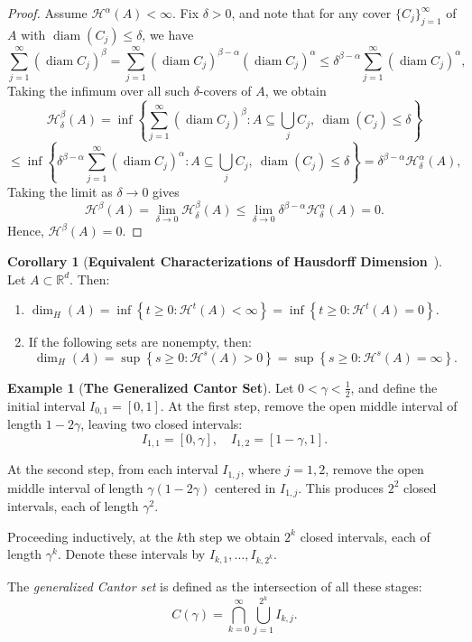 \documentclass[12pt,a4paper]{report}
\theoremstyle{definition}
\newtheorem{example}{Example}
\newtheorem{corollary}{Corollary}
\begin{document}
\begin{proof}
Assume $\mathcal{H}^\alpha(A) < \infty.$ Fix \( \delta > 0 \), and note that for any cover \( \{C_j\}_{j=1}^{\infty} \) of \( A \) with \( \operatorname{diam}(C_j) \leq \delta \), we have
\[
\sum_{j=1}^\infty (\operatorname{diam} C_j)^\beta
= \sum_{j=1}^\infty (\operatorname{diam} C_j)^{\beta - \alpha} (\operatorname{diam} C_j)^\alpha
\leq \delta^{\beta - \alpha} \sum_{j=1}^\infty (\operatorname{diam} C_j)^\alpha,
\]
Taking the infimum over all such \( \delta \)-covers of \( A \), we obtain
\[
\mathcal{H}^\beta_\delta(A)
= \inf \left\{ \sum_{j=1}^\infty (\operatorname{diam} C_j)^\beta : A \subseteq \bigcup_j C_j,\ \operatorname{diam}(C_j) \leq \delta \right\}
\]
\[
\leq \inf \left\{ \delta^{\beta - \alpha} \sum_{j=1}^\infty (\operatorname{diam} C_j)^\alpha : A \subseteq \bigcup_j C_j,\ \operatorname{diam}(C_j) \leq \delta \right\}
= \delta^{\beta - \alpha} \mathcal{H}^\alpha_\delta(A),
\]
Taking the limit as \( \delta \to 0 \) gives
\[
\mathcal{H}^\beta(A) = \lim_{\delta \to 0} \mathcal{H}^\beta_\delta(A) \leq \lim_{\delta \to 0} \delta^{\beta - \alpha} \mathcal{H}^\alpha_\delta(A) = 0.
\]
Hence, \(\mathcal{H}^\beta(A) = 0\).
\end{proof}

\begin{corollary}[\textbf{Equivalent Characterizations of Hausdorff Dimension}~{\cite{mattila2012fourier}}]
Let \( A \subset \mathbb{R}^d \). Then:
\begin{enumerate}
    \item
    $\dim_H(A) = \inf \left\{ t \geq 0 : \mathcal{H}^t(A) < \infty \right\}
    = \inf \left\{ t \geq 0 : \mathcal{H}^t(A) = 0 \right\}.$


    \item If the following sets are nonempty, then:
    \[
    \dim_H(A) = \sup \left\{ s \geq 0 : \mathcal{H}^s(A) > 0 \right\}
    = \sup \left\{ s \geq 0 : \mathcal{H}^s(A) = \infty \right\}.
    \]
\end{enumerate}
\end{corollary}

\begin{example}[\textbf{The Generalized Cantor Set}]
Let \( 0 < \gamma < \frac{1}{2} \), and define the initial interval \( I_{0,1} = [0,1] \). At the first step, remove the open middle interval of length \( 1 - 2\gamma \), leaving two closed intervals:
\[
I_{1,1} = [0, \gamma], \quad I_{1,2} = [1 - \gamma, 1].
\]

At the second step, from each interval \( I_{1,j} \), where $j = 1, 2$, remove the open middle interval of length \( \gamma(1 - 2\gamma) \) centered in \( I_{1,j} \). This produces \( 2^2 \) closed intervals, each of length \( \gamma^2 \).

Proceeding inductively, at the \( k \)th step we obtain \( 2^k \) closed intervals, each of length \( \gamma^k \). Denote these intervals by \( I_{k,1}, \dots, I_{k,2^k} \).

The \emph{generalized Cantor set} is defined as the intersection of all these stages:
\[
C(\gamma) = \bigcap_{k=0}^{\infty} \bigcup_{j=1}^{2^k} I_{k,j}.
\]
\end{example}
\end{document}
